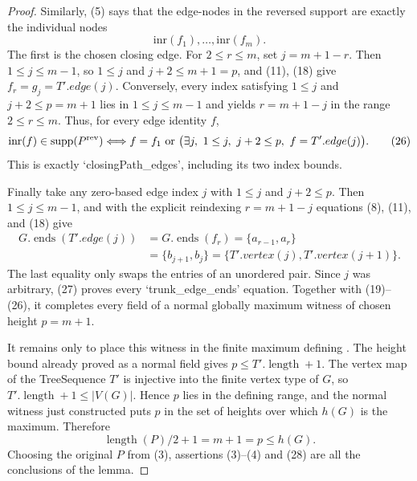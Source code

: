 \begin{proof}
Similarly, (5) says that the edge-nodes in the reversed support are
exactly the individual nodes
\[
             \mathrm{inr}(f_1),\ldots,\mathrm{inr}(f_m).          \tag{25}
\]
The first is the chosen closing edge.  For $2\leq r\leq m$, set
$j=m+1-r$.  Then $1\leq j\leq m-1$, so
$1\leq j$ and $j+2\leq m+1=p$, and (11), (18) give
$f_r=g_j=T'.edge(j)$.  Conversely, every index satisfying
$1\leq j$ and $j+2\leq p=m+1$ lies in $1\leq j\leq m-1$ and yields
$r=m+1-j$ in the range $2\leq r\leq m$.  Thus, for every edge identity
$f$,
\[
 \mathrm{inr}(f)\in\operatorname{supp}(P^{\mathrm{rev}})
 \Longleftrightarrow
 f=f_1\ \hbox{or}\
 \bigl(\exists j,\ 1\leq j,\ j+2\leq p,\ f=T'.edge(j)\bigr).     \tag{26}
\]
This is exactly `closingPath_edges', including its two index bounds.

Finally take any zero-based edge index $j$ with
$1\leq j$ and $j+2\leq p$.  Then $1\leq j\leq m-1$, and with the explicit
reindexing $r=m+1-j$ equations (8), (11), and (18) give
\[
 \begin{split}
 G.\operatorname{ends}(T'.edge(j))
 &=G.\operatorname{ends}(f_r)
   =\{a_{r-1},a_r\}\\
 &=\{b_{j+1},b_j\}
   =\{T'.vertex(j),T'.vertex(j+1)\}.
 \end{split}                                                       \tag{27}
\]
The last equality only swaps the entries of an unordered pair.  Since
$j$ was arbitrary, (27) proves every `trunk_edge_ends' equation.  Together
with (19)--(26), it completes every field of a normal globally maximum
witness of chosen height $p=m+1$.

It remains only to place this witness in the finite maximum defining
\noderef{ScheideGraphHeight}.  The height bound already proved as a normal
field gives $p\leq T'.\operatorname{length}+1$.  The vertex map of the
TreeSequence $T'$ is injective into the finite vertex type of $G$, so
$T'.\operatorname{length}+1\leq |V(G)|$.  Hence $p$ lies in the defining
range, and the normal witness just constructed puts $p$ in the set of
heights over which $h(G)$ is the maximum.  Therefore
\[
 \operatorname{length}(P)/2+1=m+1=p\leq h(G).                    \tag{28}
\]
Choosing the original $P$ from (3), assertions (3)--(4) and (28) are all
the conclusions of the lemma.
\end{proof}
